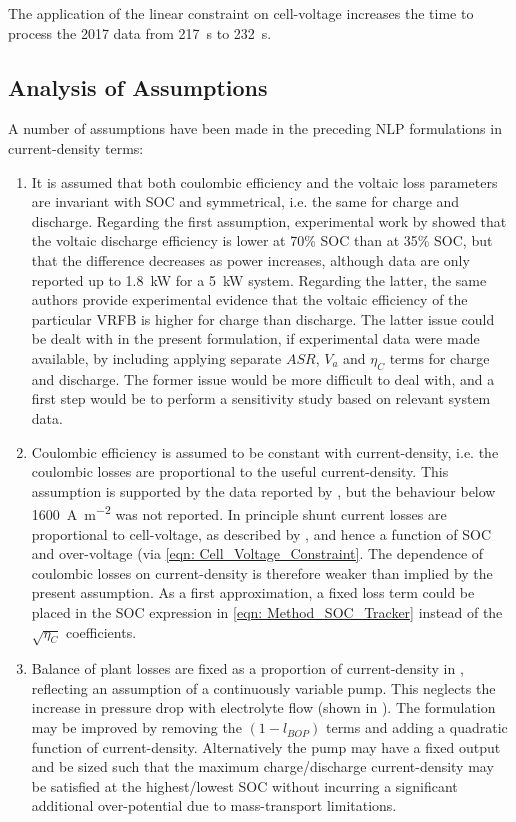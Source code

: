 \documentclass[preprint,3p,review,authoryear,10pt]{elsarticle}
\begin{document}
The application of the linear constraint on cell-voltage increases the time to process the 2017 data from \SI{217}{\second} to \SI{232}{\second}.

\subsection{Analysis of Assumptions}
\label{analysis_of_assumptions}
A number of assumptions have been made in the preceding NLP formulations in current-density terms:

\begin{enumerate}

    \item It is assumed that both coulombic efficiency and the voltaic loss parameters are invariant with SOC and symmetrical, i.e. the same for charge and discharge. Regarding the first assumption, experimental work by \cite{Nguyen2014} showed that the voltaic discharge efficiency is lower at 70\% SOC than at 35\% SOC, but that the difference decreases as power increases, although data are only reported up to \SI{1.8}{\kilo\watt} for a \SI{5}{\kilo\watt} system. Regarding the latter, the same authors provide experimental evidence that the voltaic efficiency of the particular VRFB is higher for charge than discharge. The latter issue could be dealt with in the present formulation, if experimental data were made available, by including applying separate $ASR$, $V_a$ and $\eta_{C}$ terms for charge and discharge. The former issue would be more difficult to deal with, and a first step would be to perform a sensitivity study based on relevant system data.
    
    \item Coulombic efficiency is assumed to be constant with current-density, i.e. the coulombic losses are proportional to the useful current-density. This assumption is supported by the data reported by \cite{Reed2016}, but the behaviour below \SI{1600}{\ampere\per\square\meter} was not reported. In principle shunt current losses are proportional to cell-voltage, as described by \cite{Xing2011}, and hence a function of SOC and over-voltage (via \cref{eqn: Cell_Voltage_Constraint}. The dependence of coulombic losses on current-density is therefore weaker than implied by the present assumption. As a first approximation, a fixed loss term could be placed in the SOC expression in \cref{eqn: Method_SOC_Tracker} instead of the $\sqrt{\eta_C}$ coefficients.
    
    \item Balance of plant losses are fixed as a proportion of current-density in , reflecting an assumption of a continuously variable pump. This neglects the increase in pressure drop with electrolyte flow (shown in \cite{Reed2016}). The formulation may be improved by removing the $(1-l_{BOP})$ terms and adding a quadratic function of current-density. Alternatively the pump may have a  fixed output and be sized such that the maximum charge/discharge current-density may be satisfied at the highest/lowest SOC without incurring a significant additional over-potential due to mass-transport limitations.
    

\end{enumerate}
\end{document}
